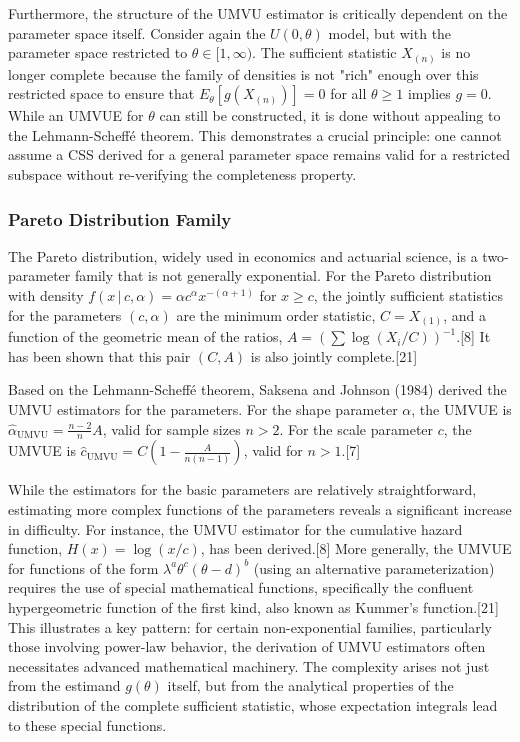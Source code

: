 \documentclass[11pt, letterpaper]{article}
\newcommand{\given}{\,|\,}
\begin{document}
Furthermore, the structure of the UMVU estimator is critically dependent on the parameter space itself. Consider again the $U(0,\theta)$ model, but with the parameter space restricted to $\theta \in [1, \infty)$. The sufficient statistic $X_{(n)}$ is no longer complete because the family of densities is not "rich" enough over this restricted space to ensure that $E_\theta[g(X_{(n)})]=0$ for all $\theta \ge 1$ implies $g=0$. While an UMVUE for $\theta$ can still be constructed, it is done without appealing to the Lehmann-Scheffé theorem. This demonstrates a crucial principle: one cannot assume a CSS derived for a general parameter space remains valid for a restricted subspace without re-verifying the completeness property.

\subsubsection*{Pareto Distribution Family}
The Pareto distribution, widely used in economics and actuarial science, is a two-parameter family that is not generally exponential. For the Pareto distribution with density $f(x \given c, \alpha) = \alpha c^\alpha x^{-(\alpha+1)}$ for $x \ge c$, the jointly sufficient statistics for the parameters $(c, \alpha)$ are the minimum order statistic, $C=X_{(1)}$, and a function of the geometric mean of the ratios, $A = (\sum \log(X_i/C))^{-1}$.[8] It has been shown that this pair $(C,A)$ is also jointly complete.[21]

Based on the Lehmann-Scheffé theorem, Saksena and Johnson (1984) derived the UMVU estimators for the parameters. For the shape parameter $\alpha$, the UMVUE is $\hat{\alpha}_{\text{UMVU}} = \frac{n-2}{n} A$, valid for sample sizes $n>2$. For the scale parameter $c$, the UMVUE is $\hat{c}_{\text{UMVU}} = C(1 - \frac{A}{n(n-1)})$, valid for $n>1$.[7]

While the estimators for the basic parameters are relatively straightforward, estimating more complex functions of the parameters reveals a significant increase in difficulty. For instance, the UMVU estimator for the cumulative hazard function, $H(x) = \log(x/c)$, has been derived.[8] More generally, the UMVUE for functions of the form $\lambda^a \theta^c (\theta-d)^b$ (using an alternative parameterization) requires the use of special mathematical functions, specifically the confluent hypergeometric function of the first kind, also known as Kummer's function.[21] This illustrates a key pattern: for certain non-exponential families, particularly those involving power-law behavior, the derivation of UMVU estimators often necessitates advanced mathematical machinery. The complexity arises not just from the estimand $g(\theta)$ itself, but from the analytical properties of the distribution of the complete sufficient statistic, whose expectation integrals lead to these special functions.
\end{document}
